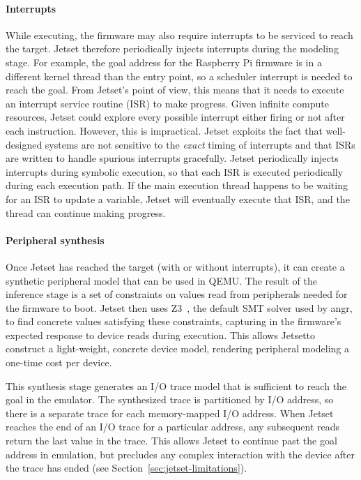 \paragraph{Interrupts}
While executing, the firmware may also require interrupts to be serviced to reach the target.
Jetset therefore periodically injects interrupts during the modeling stage.
For example, the goal address for the Raspberry Pi firmware is in a different kernel thread than the entry point, so a scheduler interrupt is needed to reach the goal.
From Jetset's point of view, this means that it needs to execute an interrupt service routine (ISR) to make progress.
Given infinite compute resources, Jetset could explore every possible interrupt either firing or not after each instruction.
However, this is impractical.
Jetset exploits the fact that well-designed systems are not sensitive to the \emph{exact} timing of interrupts and that ISRs are written to handle spurious interrupts gracefully.
Jetset periodically injects interrupts during symbolic execution, so that each ISR is executed periodically during each execution path.
If the main execution thread happens to be waiting for an ISR to update a variable, Jetset will eventually execute that ISR, and the thread can continue making progress.

\paragraph{Peripheral synthesis}
Once Jetset has reached the target (with or without interrupts), it can create a synthetic peripheral model that can be used in QEMU.
The result of the inference stage is a set of constraints on values read from peripherals needed for the firmware to boot.
Jetset then uses Z3~\cite{zthree}, the default SMT solver used by angr, to find concrete values satisfying these constraints, capturing in the firmware's expected response to device reads during execution.
This allows Jetsetto construct a light-weight, concrete device model, rendering peripheral modeling a one-time cost per device.

This synthesis stage generates an I/O trace model that is sufficient to reach the goal in the emulator.
The synthesized trace is partitioned by I/O address, so there is a separate trace for each memory-mapped I/O address.
When Jetset reaches the end of an I/O trace for a particular address, any subsequent reads return the last value in the trace.
This allows Jetset to continue past the goal address in emulation, but precludes any complex interaction with the device after the trace has ended (see Section~\ref{sec:jetset-limitations}).

